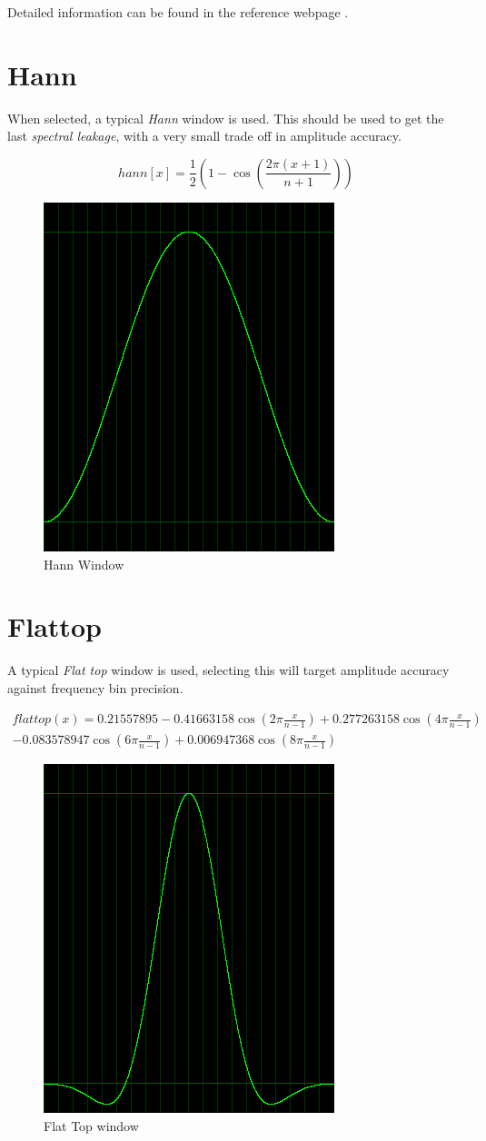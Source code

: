 \documentclass[10pt,a4paper]{report}
\begin{document}
\begin{appendices}
Detailed information can be found in the reference webpage \cite{tukey}.

\newpage
\section{Hann}
When selected, a typical \textit{Hann} window is used. This should be used to get the last \textit{spectral leakage}, with a very small trade off in amplitude accuracy.

\begin{equation}
hann[x] = \frac{1}{2}(1 - \cos(\frac{2\pi(x+1)}{n+1}))
\end{equation}

\begin{figure}[H]
	\centering
	\includegraphics[width=0.4\linewidth]{images/windows/window-hann.png}
	\caption[Hann Window]{Hann Window}
	\label{fig:window-hann}
\end{figure}

\newpage
\section{Flattop}
A typical \textit{Flat top} window is used, selecting this will target amplitude accuracy against frequency bin precision.

\begin{align*}
flattop(x)=0.21557895 - 0.41663158\cos(2\pi\frac{x}{n-1})+ 0.277263158\cos(4\pi\frac{x}{n-1})\\
- 0.083578947\cos(6\pi\frac{x}{n-1}) + 0.006947368\cos(8\pi\frac{x}{n-1})
\end{align*}

\begin{figure}[H]
	\centering
	\includegraphics[width=0.4\linewidth]{images/windows/window-flattop.png}
	\caption[Flat Top window]{Flat Top window}
	\label{fig:window-flattop}
\end{figure}


\end{appendices}
\end{document}
